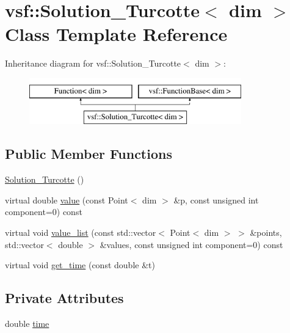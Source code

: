 \hypertarget{classvsf_1_1Solution__Turcotte}{\section{vsf\-:\-:Solution\-\_\-\-Turcotte$<$ dim $>$ Class Template Reference}
\label{classvsf_1_1Solution__Turcotte}
}
Inheritance diagram for vsf\-:\-:Solution\-\_\-\-Turcotte$<$ dim $>$\-:\begin{figure}[H]
\begin{center}
\leavevmode
\includegraphics[height=2.000000cm]{classvsf_1_1Solution__Turcotte}
\end{center}
\end{figure}
\subsection*{Public Member Functions}
\begin{DoxyCompactItemize}
\item 
\hyperlink{classvsf_1_1Solution__Turcotte_a30c7ada8fc223741d07f3e4f5f15f6be}{Solution\-\_\-\-Turcotte} ()
\item 
virtual double \hyperlink{classvsf_1_1Solution__Turcotte_a14a3516d1011ab7cb0bbc9e95ba281f2}{value} (const Point$<$ dim $>$ \&p, const unsigned int component=0) const 
\item 
virtual void \hyperlink{classvsf_1_1Solution__Turcotte_a1208e498d2ce30b41a47ebe2d8c8c058}{value\-\_\-list} (const std\-::vector$<$ Point$<$ dim $>$ $>$ \&points, std\-::vector$<$ double $>$ \&values, const unsigned int component=0) const 
\item 
virtual void \hyperlink{classvsf_1_1Solution__Turcotte_af641b6a8b3a9685773e61736160a5fb2}{get\-\_\-time} (const double \&t)
\end{DoxyCompactItemize}
\subsection*{Private Attributes}
\begin{DoxyCompactItemize}
\item 
double \hyperlink{classvsf_1_1Solution__Turcotte_a5f58ba10fac1adc353f0e4889f9037b6}{time}
\end{DoxyCompactItemize}
